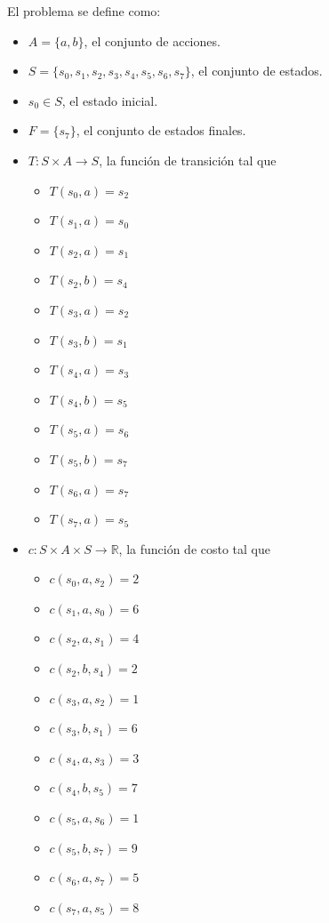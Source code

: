 El problema se define como:
\begin{itemize}
    \item $A=\{a, b\}$, el conjunto de acciones.
    \item $S=\{s_0, s_1, s_2, s_3, s_4, s_5, s_6, s_7\}$, el conjunto de estados.
    \item $s_0 \in S$, el estado inicial.
    \item $F = \{s_7\}$, el conjunto de estados finales.
    \item $T: S \times A \to S$, la función de transición tal que
        \begin{itemize}
            \item $T(s_0, a) = s_2$
            \item $T(s_1, a) = s_0$
            \item $T(s_2, a) = s_1$
            \item $T(s_2, b) = s_4$
            \item $T(s_3, a) = s_2$
            \item $T(s_3, b) = s_1$
            \item $T(s_4, a) = s_3$
            \item $T(s_4, b) = s_5$
            \item $T(s_5, a) = s_6$
            \item $T(s_5, b) = s_7$
            \item $T(s_6, a) = s_7$
            \item $T(s_7, a) = s_5$
        \end{itemize}

    \item $c: S \times A \times S \to \mathbb{R}$, la función de costo tal que
        \begin{itemize}
            \item $c(s_0, a, s_2) = 2$
            \item $c(s_1, a, s_0) = 6$
            \item $c(s_2, a, s_1) = 4$
            \item $c(s_2, b, s_4) = 2$
            \item $c(s_3, a, s_2) = 1$
            \item $c(s_3, b, s_1) = 6$
            \item $c(s_4, a, s_3) = 3$
            \item $c(s_4, b, s_5) = 7$
            \item $c(s_5, a, s_6) = 1$
            \item $c(s_5, b, s_7) = 9$
            \item $c(s_6, a, s_7) = 5$
            \item $c(s_7, a, s_5) = 8$
        \end{itemize} 
\end{itemize}